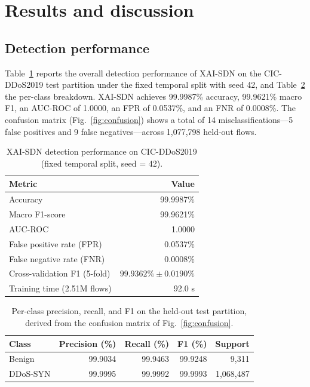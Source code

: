 ﻿\documentclass[journal]{IEEEtran}
\begin{document}
\section{Results and discussion}
\label{sec:results}

\subsection{Detection performance}
Table~\ref{tab:results} reports the overall detection performance of XAI-SDN on the CIC-DDoS2019 test partition under the fixed temporal split with seed 42, and Table~\ref{tab:perclass} the per-class breakdown. XAI-SDN achieves 99.9987\% accuracy, 99.9621\% macro F1, an AUC-ROC of 1.0000, an FPR of 0.0537\%, and an FNR of 0.0008\%. The confusion matrix (Fig.~\ref{fig:confusion}) shows a total of 14 misclassifications---5 false positives and 9 false negatives---across 1,077,798 held-out flows.

\begin{table}[!t]
\centering
\caption{XAI-SDN detection performance on CIC-DDoS2019 (fixed temporal split, seed = 42).}
\label{tab:results}
\begin{tabular}{@{}lr@{}}
\toprule
\textbf{Metric} & \textbf{Value} \\
\midrule
Accuracy & 99.9987\% \\
Macro F1-score & 99.9621\% \\
AUC-ROC & 1.0000 \\
False positive rate (FPR) & 0.0537\% \\
False negative rate (FNR) & 0.0008\% \\
Cross-validation F1 (5-fold) & $99.9362\% \pm 0.0190\%$ \\
Training time (2.51M flows) & 92.0 s \\
\bottomrule
\end{tabular}
\end{table}

\begin{table}[!t]
\centering
\caption{Per-class precision, recall, and F1 on the held-out test partition, derived from the confusion matrix of Fig.~\ref{fig:confusion}.}
\label{tab:perclass}
\small
\setlength{\tabcolsep}{4pt}
\begin{tabular}{@{}lrrrr@{}}
\toprule
\textbf{Class} & \textbf{Precision (\%)} & \textbf{Recall (\%)} & \textbf{F1 (\%)} & \textbf{Support} \\
\midrule
Benign & 99.9034 & 99.9463 & 99.9248 & 9,311 \\
DDoS-SYN & 99.9995 & 99.9992 & 99.9993 & 1,068,487 \\
\bottomrule
\end{tabular}
\end{table}
\end{document}
